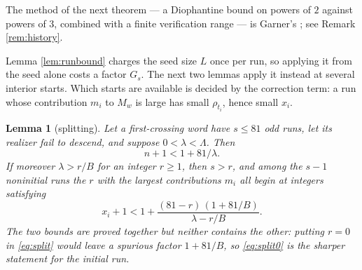 \documentclass[11pt,a4paper]{article}
\theoremstyle{plain}\newtheorem{theorem}{Theorem}\newtheorem{proposition}[theorem]{Proposition}
\newtheorem{lemma}[theorem]{Lemma}\newtheorem{corollary}[theorem]{Corollary}
\theoremstyle{definition}\newtheorem{example}[theorem]{Example}
\theoremstyle{remark}\newtheorem{remark}[theorem]{Remark}
\begin{document}
The method of the next theorem --- a Diophantine bound on powers of $2$ against powers of $3$,
combined with a finite verification range --- is Garner's \cite[\S6--\S7]{garner1981}; see
Remark \ref{rem:history}.

Lemma \ref{lem:runbound} charges the seed size $L$ once per run, so applying it from the seed
alone costs a factor $G_s$. The next two lemmas apply it instead at several interior starts.
Which starts are available is decided by the correction term: a run whose contribution $m_i$ to
$M_w$ is large has small $\rho_{t_i}$, hence small $x_i$.

\begin{lemma}[splitting]\label{lem:split}
Let a first-crossing word have $s\le81$ odd runs, let its realizer fail to descend, and suppose
$0<\lambda<\Lambda$. Then
\begin{equation}\label{eq:split0}
 n+1<1+81/\lambda .
\end{equation}
If moreover $\lambda>r/B$ for an integer $r\ge1$, then $s>r$, and among the $s-1$ noninitial
runs the $r$ with the largest contributions $m_i$ all begin at integers satisfying
\begin{equation}\label{eq:split}
 x_i+1<1+\frac{(81-r)\,(1+81/B)}{\lambda-r/B}.
\end{equation}
The two bounds are proved together but neither contains the other: putting $r=0$ in
\eqref{eq:split} would leave a spurious factor $1+81/B$, so \eqref{eq:split0} is the sharper
statement for the initial run.
\end{lemma}
\end{document}
